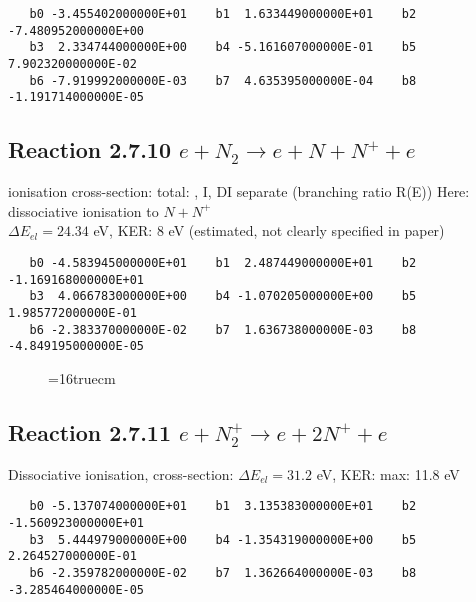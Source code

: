 \documentclass[12pt,dvipdfmx]{article}
\begin{document}
\begin{small}\begin{verbatim}
   b0 -3.455402000000E+01    b1  1.633449000000E+01    b2 -7.480952000000E+00
   b3  2.334744000000E+00    b4 -5.161607000000E-01    b5  7.902320000000E-02
   b6 -7.919992000000E-03    b7  4.635395000000E-04    b8 -1.191714000000E-05
\end{verbatim}\end{small}

\subsection{
Reaction 2.7.10  $e + N_2 \rightarrow e + N + N^+ +e$ }
ionisation cross-section: total: \cite{kn:Rapp1}, I, DI separate \cite{kn:Rapp2} (branching ratio R(E))
Here: dissociative ionisation to $N + N^+$ \\
$\Delta E_{el} = 24.34 $ eV, KER: 8 eV  (estimated, not clearly specified in paper)

\begin{small}\begin{verbatim}
   b0 -4.583945000000E+01    b1  2.487449000000E+01    b2 -1.169168000000E+01
   b3  4.066783000000E+00    b4 -1.070205000000E+00    b5  1.985772000000E-01
   b6 -2.383370000000E-02    b7  1.636738000000E-03    b8 -4.849195000000E-05
\end{verbatim}\end{small}


\begin{figure} \label{n2rates}
\epsfxsize=16truecm
\end{figure}
\newpage

\subsection{
Reaction 2.7.11  $e + N_2^+ \rightarrow e + 2 N^+ +e$ }
Dissociative ionisation, cross-section: \cite{kn:Bahati}
$\Delta E_{el} = 31.2 $ eV, KER: max: 11.8 eV

\begin{small}\begin{verbatim}
   b0 -5.137074000000E+01    b1  3.135383000000E+01    b2 -1.560923000000E+01
   b3  5.444979000000E+00    b4 -1.354319000000E+00    b5  2.264527000000E-01
   b6 -2.359782000000E-02    b7  1.362664000000E-03    b8 -3.285464000000E-05
\end{verbatim}\end{small}
\end{document}
